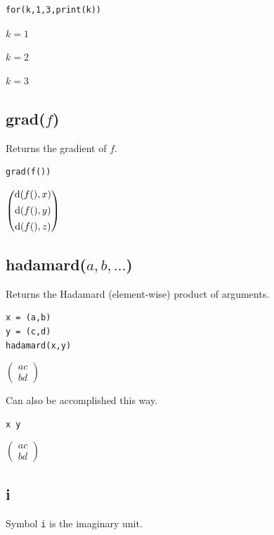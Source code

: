 {\color{blue}
\begin{verbatim}
for(k,1,3,print(k))
\end{verbatim}
}

$k=1$

$k=2$

$k=3$

\subsection*{grad($f$)}

Returns the gradient of $f$.

{\color{blue}
\begin{verbatim}
grad(f())
\end{verbatim}
}

$\displaystyle
\begin{pmatrix}
{\rm d}(f(),x)
\\[1ex]
{\rm d}(f(),y)
\\[1ex]
{\rm d}(f(),z)
\end{pmatrix}
$

\subsection*{hadamard($a,b,\ldots$)}

Returns the Hadamard (element-wise) product of arguments.

{\color{blue}
\begin{verbatim}
x = (a,b)
y = (c,d)
hadamard(x,y)
\end{verbatim}
}

$
\begin{pmatrix}
a c
\\[1ex]
b d
\end{pmatrix}
$

\bigskip
Can also be accomplished this way.

{\color{blue}
\begin{verbatim}
x y
\end{verbatim}
}

$
\begin{pmatrix}
a c
\\[1ex]
b d
\end{pmatrix}
$

\subsection*{i}

Symbol {\tt i} is the imaginary unit.

